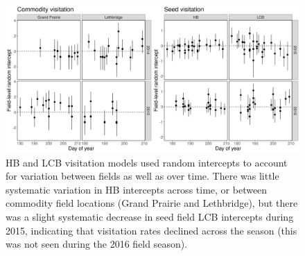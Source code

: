 \documentclass[12pt]{article} %
\begin{document}
\begin{figure}[h]
    \centering
    \includegraphics[width=\textwidth,keepaspectratio=true]{both_beeInt_time.png}
    \caption[Visitation model intercepts over time]{HB and LCB visitation models used random intercepts to account for variation between fields as well as over time. There was little systematic variation in HB intercepts across time, or between commodity field locations (Grand Prairie and Lethbridge), but there was a slight systematic decrease in seed field LCB intercepts during 2015, indicating that visitation rates declined across the season (this was not seen during the 2016 field season).}
\end{figure}
\end{document}
